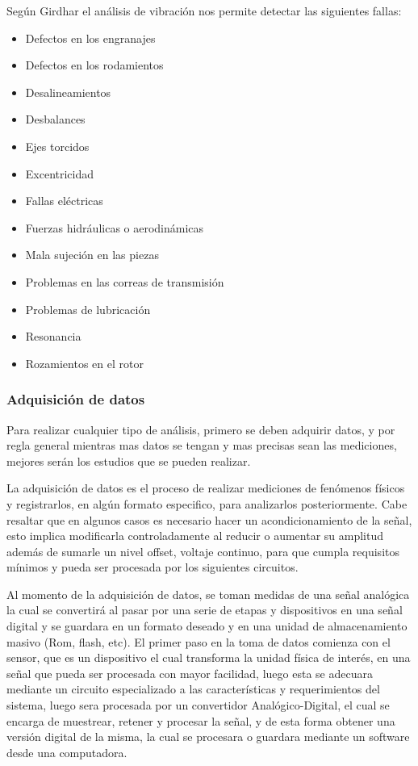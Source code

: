Según Girdhar \Cite{Girdhar}  el análisis de vibración nos permite detectar las
siguientes fallas:

\begin{itemize}
\item Defectos en los engranajes
\item Defectos en los rodamientos
\item Desalineamientos
\item Desbalances
\item Ejes torcidos
\item Excentricidad
\item Fallas eléctricas
\item Fuerzas hidráulicas o aerodinámicas
\item Mala sujeción en las piezas
\item Problemas en las correas de transmisión
\item Problemas de lubricación
\item Resonancia
\item Rozamientos en el rotor
\end{itemize}


\subsubsection*{Adquisición de datos}

Para realizar cualquier tipo de análisis, primero se deben adquirir datos, y
por regla general mientras mas datos se tengan y mas precisas sean las
mediciones, mejores serán los estudios que se pueden realizar.

La adquisición de datos es el proceso de realizar mediciones de fenómenos físicos
y registrarlos, en algún formato especifico, para analizarlos posteriormente.
Cabe resaltar que en algunos casos es necesario hacer un acondicionamiento de
la señal, esto
implica modificarla controladamente al reducir o aumentar su amplitud además de
sumarle un nivel offset, voltaje continuo, para que cumpla requisitos mínimos
y pueda ser procesada por los siguientes circuitos.

Al momento de la adquisición de datos, se toman medidas de una señal analógica
la cual se convertirá al pasar por una serie de etapas y dispositivos en una
señal digital y se guardara en un formato deseado y en una unidad de
almacenamiento masivo (Rom, flash, etc).
El primer paso en la toma de  datos comienza con el sensor, que es un
dispositivo el cual transforma la unidad física de interés, en una señal que
pueda ser procesada con mayor facilidad, luego esta se adecuara mediante un
circuito especializado a las características y requerimientos del sistema,
luego sera procesada por un convertidor Analógico-Digital, el cual se encarga de
muestrear, retener y procesar la señal, y de esta forma obtener una versión
digital de la misma, la cual se procesara o guardara mediante un software desde
una computadora.

